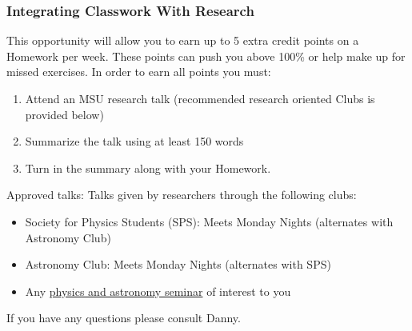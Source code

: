 \documentclass[11pt]{article}
\begin{document}
    \subsubsection{Integrating Classwork With
Research}\label{integrating-classwork-with-research}

This opportunity will allow you to earn up to 5 extra credit points on a
Homework per week. These points can push you above 100\% or help make up
for missed exercises. In order to earn all points you must:

\begin{enumerate}
\def\labelenumi{\arabic{enumi}.}
\item
  Attend an MSU research talk (recommended research oriented Clubs is
  provided below)
\item
  Summarize the talk using at least 150 words
\item
  Turn in the summary along with your Homework.
\end{enumerate}

Approved talks: Talks given by researchers through the following clubs:

\begin{itemize}
\item
  Society for Physics Students (SPS)\hspace{0pt}: Meets Monday Nights
  (alternates with Astronomy Club)
\item
  Astronomy Club\hspace{0pt}: Meets Monday Nights (alternates with SPS)
\item
  Any \href{https://pa.msu.edu/news-events-seminars/index.aspx}{physics
  and astronomy seminar} of interest to you
\end{itemize}

If you have any questions please consult Danny.

    


    
    
    
\end{document}
